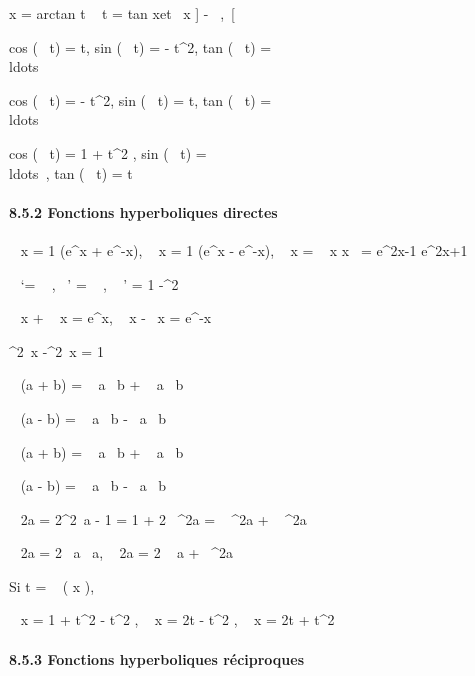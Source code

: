 \documentclass[]{article}
\begin{document}
x = arctan t \mathrel\Leftrightarrow~ t
= tan x\text et ~x \in] -
\pi~,\pi~[

cos (\arccos~ t) = t,
sin (\arccos~ t) =
 - t^2,
tan (\arccos~ t) =
\\ldots~

cos (\arcsin~ t) =
 - t^2,
sin (\arcsin~ t) = t,
tan (\arcsin~ t) =
\\ldots~

cos (\arctan~ t) = 1
\over {} + t^2 ,
sin (\arctan~ t) =
\\ldots~,
tan (\arctan~ t) = t

\paragraph{8.5.2 Fonctions hyperboliques directes}

\mathrmch~ x = 1
 (e^x + e^-x),
\mathrmsh~ x = 1
 (e^x - e^-x),
\mathrmth~ x =
\mathrmsh~ x
\over
\mathrmch x~ =
e^2x-1 \over e^2x+1

 \mathrmch~
`= \mathrmsh~ ,
\mathrmsh~'
= \mathrmch~ ,
\mathrmth~ ' = 1
-\mathrmth ^2~

 \mathrmch~ x
+ \mathrmsh~ x =
e^x, \mathrmch~ x
-\mathrmsh~ x =
e^-x

 \mathrmch ^2~x
-\mathrmsh ^2~x =
1

\mathrmch~ (a + b)
= \mathrmch~
a\mathrmch~ b
+ \mathrmsh~
a\mathrmsh~ b

\mathrmch~ (a - b)
= \mathrmch~
a\mathrmch~ b
-\mathrmsh~
a\mathrmsh~ b

\mathrmsh~ (a + b)
= \mathrmsh~
a\mathrmch~ b
+ \mathrmch~
a\mathrmsh~ b

\mathrmsh~ (a - b)
= \mathrmsh~
a\mathrmch~ b
-\mathrmch~
a\mathrmsh~ b

\mathrmch~ 2a =
2\mathrmch ^2~a -
1 = 1 + 2\mathrmsh~
^2a = \mathrmch~
^2a + \mathrmsh~
^2a

\mathrmsh~ 2a =
2\mathrmsh~
a\mathrmch~ a,
\mathrmth~ 2a =
2 \mathrmth~ a
+\mathrmth~
^2a

Si t = \mathrmth~ ( x
 ),

\mathrmch~ x = 1 +
t^2  - t^2 ,
\mathrmsh~ x = 2t
 - t^2 ,
\mathrmth~ x = 2t
 + t^2

\paragraph{8.5.3 Fonctions hyperboliques réciproques}
\end{document}
